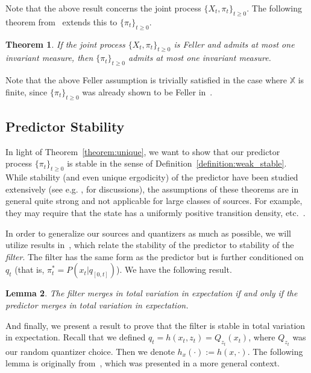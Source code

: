 \documentclass[conference]{IEEEtran}
\newtheorem{theorem}{Theorem}[section]
\newtheorem{lemma}[theorem]{Lemma}
\begin{document}
Note that the above result concerns the joint process \( \{X_t,\pi_t \}_{t\ge0} \). The following theorem from~\cite{Stettner} extends this to \( \{\pi_t \}_{t\ge0} \).

\begin{theorem}\label{theorem:3.2}\cite[Theorem 3]{Stettner}
    If the joint process \( \{X_t,\pi_t \}_{t\ge0} \) is Feller and admits at most one invariant measure, then \( \{\pi_t\}_{t\ge0} \) admits at most one invariant measure.
\end{theorem}

Note that the above Feller assumption is trivially satisfied in the case where \( \mathbb{X} \) is finite, since \( \{\pi_t\}_{t\ge0} \) was already shown to be Feller in~\cite{Linder}.

\subsection{Predictor Stability}
In light of Theorem~\ref{theorem:unique}, we want to show that our predictor process \( \{\pi_t\}_{t\ge0} \) is stable in the sense of Definition~\ref{definition:weak_stable}. While stability (and even unique ergodicity) of the predictor have been studied extensively (see e.g. \cite{Chigansky}, \cite{DM} for discussions), the assumptions of these theorems are in general quite strong and not applicable for large classes of sources. For example, they may require that the state has a uniformly positive transition density, etc.~\cite{Chigansky}.  %

In order to generalize our sources and quantizers as much as possible, we will utilize results in~\cite{Curtis}, which relate the stability of the predictor to stability of the \emph{filter}. The filter has the same form as the predictor but is further conditioned on \( q_t \) (that is, \( \pi_t^* = P(x_t | q_{[0,t]}) \)). We have the following result.

\begin{lemma}\label{lemma:filter-predictor}\cite[Theorem 2.11]{Curtis}
    The filter merges in total variation in expectation if and only if the predictor merges in total variation in expectation.
\end{lemma}

And finally, we present a result to prove that the filter is stable in total variation in expectation. Recall that we defined \(q_t = h(x_t,z_t) = Q_{z_t}(x_t)\), where \(Q_{z_t}\) was our random quantizer choice. Then we denote \(h_x(\cdot) := h(x,\cdot)\). The following lemma is originally from~\cite{Handel}, which was presented in a more general context.
\end{document}
